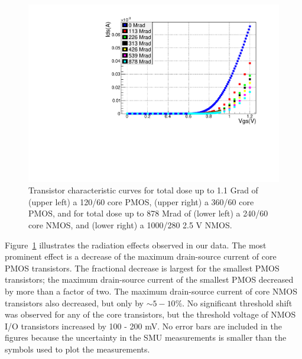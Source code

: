 \begin{figure}
\begin{minipage}[b]{.5\linewidth}
	\end{minipage}
	\hfill
	\begin{minipage}[b]{.5\linewidth}
	\includegraphics[width=\linewidth]{ddg1u_1_comparison_paper.pdf}
	\end{minipage}
\caption{Transistor characteristic curves for total dose up to 1.1 Grad of (upper left) a 120/60 core PMOS, (upper right) a 360/60 core PMOS, and for total dose up to 878 Mrad of (lower left) a 240/60 core NMOS, and (lower right) a 1000/280 2.5 V NMOS.}
\label{fig:SuperpositionPlots}
\end{figure}

Figure~\ref{fig:SuperpositionPlots} illustrates the radiation effects observed in our data.  The most prominent effect is a decrease of the maximum drain-source current of core PMOS transistors.  The fractional decrease is largest for the smallest PMOS transistors; the maximum drain-source current of the smallest PMOS decreased by more than a factor of two.  The maximum drain-source current of core NMOS transistors also decreased, but only by $\sim5-10\%$.  No significant threshold shift was observed for any of the core transistors, but the threshold voltage of NMOS I/O transistors increased by 100 - 200 mV.  No error bars are included in the figures because the uncertainty in the SMU measurements is smaller than the symbols used to plot the measurements.

